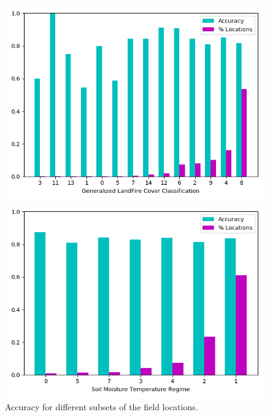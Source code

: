 \documentclass{article} %
\begin{document}
\begin{figure}
\begin{minipage}{.24\textwidth}
  \centering
\includegraphics[width=\textwidth]{pics/d4_accuracy_vs_landcover.png}
\caption{$D_3$}
\end{minipage}
\begin{minipage}{.01\textwidth}
\end{minipage}
\begin{minipage}{.24\textwidth}
  \centering
\includegraphics[width=\textwidth]{pics/d4_accuracy_vs_soil.png}
\caption{$D_4$}
\end{minipage}
\caption{Accuracy for different subsets of the field locations.}\label{fig:testmetrics}
\end{figure}
\end{document}
